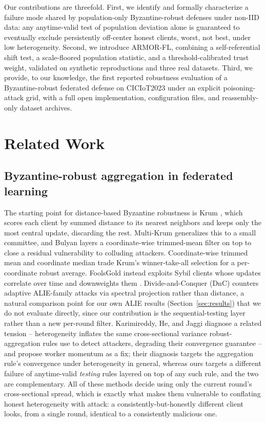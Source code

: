 \documentclass[pdflatex,iicol,sn-mathphys-num]{sn-jnl}%
\theoremstyle{thmstyleone}%
\theoremstyle{thmstyletwo}%
\theoremstyle{thmstylethree}%
\begin{document}
Our contributions are threefold. First, we identify and formally characterize a failure mode shared by population-only Byzantine-robust defenses under non-IID data: any anytime-valid test of population deviation alone is guaranteed to eventually exclude persistently off-center honest clients, worst, not best, under low heterogeneity. Second, we introduce ARMOR-FL, combining a self-referential shift test, a scale-floored population statistic, and a threshold-calibrated trust weight, validated on synthetic reproductions and three real datasets. Third, we provide, to our knowledge, the first reported robustness evaluation of a Byzantine-robust federated defense on CICIoT2023 under an explicit poisoning-attack grid, with a full open implementation, configuration files, and reassembly-only dataset archives.

\section{Related Work}\label{sec2}

\subsection{Byzantine-robust aggregation in federated learning}

The starting point for distance-based Byzantine robustness is Krum \citep{blanchard2017krum}, which scores each client by summed distance to its nearest neighbors and keeps only the most central update, discarding the rest. Multi-Krum generalizes this to a small committee, and Bulyan \citep{mhamdi2018bulyan} layers a coordinate-wise trimmed-mean filter on top to close a residual vulnerability to colluding attackers. Coordinate-wise trimmed mean and coordinate median trade Krum's winner-take-all selection for a per-coordinate robust average. FoolsGold instead exploits Sybil clients whose updates correlate over time and downweights them \citep{fung2020foolsgold}. Divide-and-Conquer (DnC) \citep{shejwalkar2021manipulating} counters adaptive ALIE-family attacks via spectral projection rather than distance, a natural comparison point for our own ALIE results (Section~\ref{sec:results}) that we do not evaluate directly, since our contribution is the sequential-testing layer rather than a new per-round filter. Karimireddy, He, and Jaggi \citep{karimireddy2021learning} diagnose a related tension -- heterogeneity inflates the same cross-sectional variance robust-aggregation rules use to detect attackers, degrading their convergence guarantee -- and propose worker momentum as a fix; their diagnosis targets the aggregation rule's convergence under heterogeneity in general, whereas ours targets a different failure of anytime-valid \emph{testing} rules layered on top of any such rule, and the two are complementary. All of these methods decide using only the current round's cross-sectional spread, which is exactly what makes them vulnerable to conflating honest heterogeneity with attack: a consistently-but-honestly different client looks, from a single round, identical to a consistently malicious one.
\end{document}
